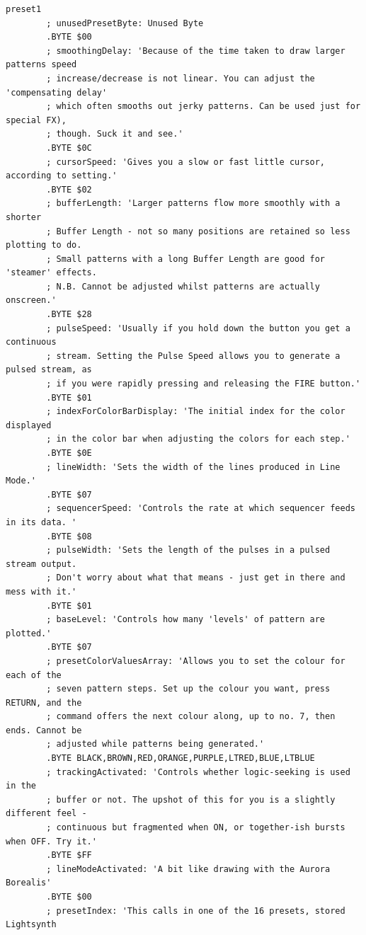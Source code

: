 \begin{lstlisting}[basicstyle=\ttfamily\tiny,caption=Source code for Preset 1.]
preset1
        ; unusedPresetByte: Unused Byte
        .BYTE $00
        ; smoothingDelay: 'Because of the time taken to draw larger patterns speed
        ; increase/decrease is not linear. You can adjust the 'compensating delay'
        ; which often smooths out jerky patterns. Can be used just for special FX),
        ; though. Suck it and see.'
        .BYTE $0C
        ; cursorSpeed: 'Gives you a slow or fast little cursor, according to setting.'
        .BYTE $02
        ; bufferLength: 'Larger patterns flow more smoothly with a shorter
        ; Buffer Length - not so many positions are retained so less plotting to do.
        ; Small patterns with a long Buffer Length are good for 'steamer' effects.
        ; N.B. Cannot be adjusted whilst patterns are actually onscreen.'
        .BYTE $28
        ; pulseSpeed: 'Usually if you hold down the button you get a continuous
        ; stream. Setting the Pulse Speed allows you to generate a pulsed stream, as
        ; if you were rapidly pressing and releasing the FIRE button.'
        .BYTE $01
        ; indexForColorBarDisplay: 'The initial index for the color displayed
        ; in the color bar when adjusting the colors for each step.'
        .BYTE $0E
        ; lineWidth: 'Sets the width of the lines produced in Line Mode.'
        .BYTE $07
        ; sequencerSpeed: 'Controls the rate at which sequencer feeds in its data. '
        .BYTE $08
        ; pulseWidth: 'Sets the length of the pulses in a pulsed stream output.
        ; Don't worry about what that means - just get in there and mess with it.'
        .BYTE $01
        ; baseLevel: 'Controls how many 'levels' of pattern are plotted.'
        .BYTE $07
        ; presetColorValuesArray: 'Allows you to set the colour for each of the
        ; seven pattern steps. Set up the colour you want, press RETURN, and the
        ; command offers the next colour along, up to no. 7, then ends. Cannot be
        ; adjusted while patterns being generated.'
        .BYTE BLACK,BROWN,RED,ORANGE,PURPLE,LTRED,BLUE,LTBLUE
        ; trackingActivated: 'Controls whether logic-seeking is used in the
        ; buffer or not. The upshot of this for you is a slightly different feel -
        ; continuous but fragmented when ON, or together-ish bursts when OFF. Try it.'
        .BYTE $FF
        ; lineModeActivated: 'A bit like drawing with the Aurora Borealis'
        .BYTE $00
        ; presetIndex: 'This calls in one of the 16 presets, stored Lightsynth

\end{lstlisting}
